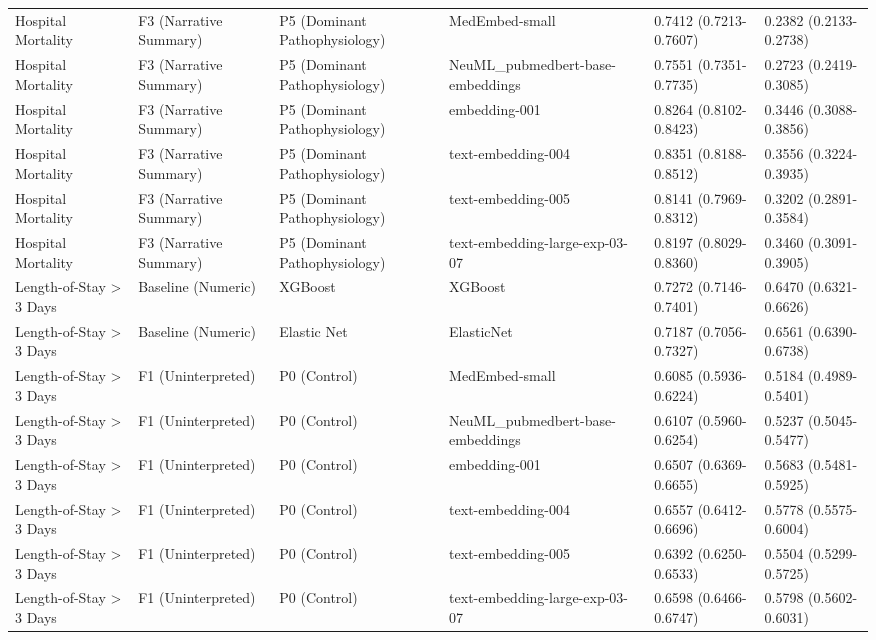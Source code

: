 \begin{tabular}{llllll}
Hospital Mortality & F3 (Narrative Summary) & P5 (Dominant Pathophysiology) & MedEmbed-small & 0.7412 (0.7213-0.7607) & 0.2382 (0.2133-0.2738) \\
Hospital Mortality & F3 (Narrative Summary) & P5 (Dominant Pathophysiology) & NeuML\_pubmedbert-base-embeddings & 0.7551 (0.7351-0.7735) & 0.2723 (0.2419-0.3085) \\
Hospital Mortality & F3 (Narrative Summary) & P5 (Dominant Pathophysiology) & embedding-001 & 0.8264 (0.8102-0.8423) & 0.3446 (0.3088-0.3856) \\
Hospital Mortality & F3 (Narrative Summary) & P5 (Dominant Pathophysiology) & text-embedding-004 & 0.8351 (0.8188-0.8512) & 0.3556 (0.3224-0.3935) \\
Hospital Mortality & F3 (Narrative Summary) & P5 (Dominant Pathophysiology) & text-embedding-005 & 0.8141 (0.7969-0.8312) & 0.3202 (0.2891-0.3584) \\
Hospital Mortality & F3 (Narrative Summary) & P5 (Dominant Pathophysiology) & text-embedding-large-exp-03-07 & 0.8197 (0.8029-0.8360) & 0.3460 (0.3091-0.3905) \\
Length-of-Stay \textgreater{} 3 Days & Baseline (Numeric) & XGBoost & XGBoost & 0.7272 (0.7146-0.7401) & 0.6470 (0.6321-0.6626) \\
Length-of-Stay \textgreater{} 3 Days & Baseline (Numeric) & Elastic Net & ElasticNet & 0.7187 (0.7056-0.7327) & 0.6561 (0.6390-0.6738) \\
Length-of-Stay \textgreater{} 3 Days & F1 (Uninterpreted) & P0 (Control) & MedEmbed-small & 0.6085 (0.5936-0.6224) & 0.5184 (0.4989-0.5401) \\
Length-of-Stay \textgreater{} 3 Days & F1 (Uninterpreted) & P0 (Control) & NeuML\_pubmedbert-base-embeddings & 0.6107 (0.5960-0.6254) & 0.5237 (0.5045-0.5477) \\
Length-of-Stay \textgreater{} 3 Days & F1 (Uninterpreted) & P0 (Control) & embedding-001 & 0.6507 (0.6369-0.6655) & 0.5683 (0.5481-0.5925) \\
Length-of-Stay \textgreater{} 3 Days & F1 (Uninterpreted) & P0 (Control) & text-embedding-004 & 0.6557 (0.6412-0.6696) & 0.5778 (0.5575-0.6004) \\
Length-of-Stay \textgreater{} 3 Days & F1 (Uninterpreted) & P0 (Control) & text-embedding-005 & 0.6392 (0.6250-0.6533) & 0.5504 (0.5299-0.5725) \\
Length-of-Stay \textgreater{} 3 Days & F1 (Uninterpreted) & P0 (Control) & text-embedding-large-exp-03-07 & 0.6598 (0.6466-0.6747) & 0.5798 (0.5602-0.6031) \\

\end{tabular}
